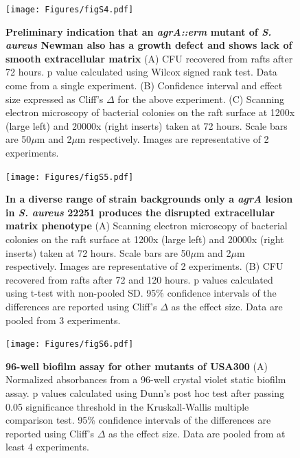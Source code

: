 \documentclass[10pt,letterpaper]{article}
\begin{document}
\begin{figure}[H]
\begin{adjustwidth}{-2.25in}{0in}
\texttt{[image: Figures/figS4.pdf]}
\caption[Preliminary indication that an \textit{agrA::erm} mutant of \textit{S. aureus} Newman also has a growth defect and shows lack of smooth extracellular matrix]{
\textbf{Preliminary indication that an \textit{agrA::erm} mutant of \textit{S. aureus} Newman also has a growth defect and shows lack of smooth extracellular matrix}
	(A) CFU recovered from rafts after 72 hours. p value calculated using Wilcox signed rank test. Data come from a single experiment.
	(B) Confidence interval and effect size expressed as Cliff's $\Delta$ for the above experiment.
	(C) Scanning electron microscopy of bacterial colonies on the raft surface at 1200x (large left) and 20000x (right inserts) taken at 72 hours. Scale bars are 50$\mu$m and 2$\mu$m respectively. Images are representative of 2 experiments.}
        \label{figS4}
        \end{adjustwidth}
\end{figure}

\begin{figure}[H]
\begin{adjustwidth}{-2.25in}{0in}
\texttt{[image: Figures/figS5.pdf]}
\caption[In a diverse range of strain backgrounds only a \textit{agrA} lesion in \textit{S. aureus} 22251 produces the disrupted extracellular matrix phenotype]{
	\textbf{In a diverse range of strain backgrounds only a \textit{agrA} lesion in \textit{S. aureus} 22251 produces the disrupted extracellular matrix phenotype}
	(A) Scanning electron microscopy of bacterial colonies on the raft surface at 1200x (large left) and 20000x (right inserts) taken at 72 hours. Scale bars are 50$\mu$m and 2$\mu$m respectively. Images are representative of 2 experiments.
	(B) CFU recovered from rafts after 72 and 120 hours. p values calculated using t-test with non-pooled SD. 95\% confidence intervals of the differences are reported using Cliff's $\Delta$ as the effect size. Data are pooled from 3 experiments.}
        \label{figS5}
        \end{adjustwidth}
\end{figure}

\begin{figure}[H]
\begin{adjustwidth}{-2.25in}{0in}
\texttt{[image: Figures/figS6.pdf]}
\caption[96-well biofilm assay for other mutants of USA300]{
	\textbf{96-well biofilm assay for other mutants of USA300}
	(A) Normalized absorbances from a 96-well crystal violet static biofilm assay. p values calculated using Dunn's post hoc test after passing 0.05 significance threshold in the Kruskall-Wallis multiple comparison test. 95\% confidence intervals of the differences are reported using Cliff's $\Delta$ as the effect size. Data are pooled from at least 4 experiments.}
        \label{figS6}
        \end{adjustwidth}
\end{figure}
\end{document}
